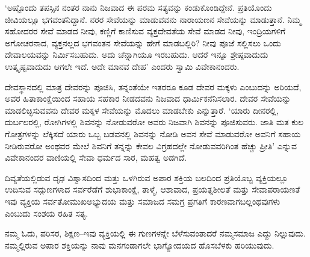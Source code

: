 ‘ಅಷ್ಟೊಂದು ತಪಸ್ಸಿನ ನಂತರ ನಾನು ನಿಜವಾದ ಈ ಪರಮ ಸತ್ಯವನ್ನು ಕಂಡುಕೊಂಡಿದ್ದೇನೆ. ಪ್ರತಿಯೊಂದು ಜೀವಿಯಲ್ಲೂ ಭಗವಂತನಿದ್ದಾನೆ. ನರರ ಸೇವೆಯನ್ನು ಮಾಡುವವನು ನಾರಾಯಣನ ಸೇವೆಯನ್ನು ಮಾಡುತ್ತಾನೆ. ನಿಮ್ಮ ಸಹೋದರರ ಸೇವೆ ಮಾಡದ ನೀವು, ಕಣ್ಣಿಗೆ ಕಾಣಿಸುವ ವ್ಯಕ್ತದೇವತೆಯ ಸೇವೆ ಮಾಡದ ನೀವು, ಇಂದ್ರಿಯಗಳಿಗೆ ಅಗೋಚರನಾದ, ವ್ಯಕ್ತನಲ್ಲದ ಭಗವಂತನ ಸೇವೆಯನ್ನು ಹೇಗೆ ಮಾಡಬಲ್ಲಿರಿ? ನೀವು ಪೂಜೆ ಸಲ್ಲಿಸಲು ಒಂದು ದೇವಾಲಯವನ್ನು ನಿರ್ಮಿಸಬಹುದು. ಅದು ಚೆನ್ನಾಗಿಯೂ ಇರಬಹುದು. ಆದರೆ ಇನ್ನೂ ಶ್ರೇಷ್ಠವಾದುದು ಉತ್ಕೃಷ್ಟವಾದುದು ಆಗಲೇ ಇದೆ. ಅದೇ ಮಾನವ ದೇಹ’ ಎಂದರು ಸ್ವಾಮಿ ವಿವೇಕಾನಂದರು.

ದೇವಸ್ಥಾನದಲ್ಲಿ ಮಾತ್ರ ದೇವರನ್ನು ಪೂಜಿಸಿ, ತನ್ನಂತೆಯೇ ಇತರರೂ ಕೂಡ ದೇವರ ಮಕ್ಕಳು ಎಂಬುದನ್ನು ಅರಿಯದೆ, ಅವರ ಹಿತಾಕಾಂಕ್ಷೆಯಿಂದ ಸಹಾಯ ಸಹಕಾರ ನೀಡದವನು ನಿಜವಾದ ಧಾರ್ಮಿಕನೆನಿಸಲಾರ. ದೇವರ ಸೇವೆಯನ್ನು ಮಾಡಲಿಚ್ಛಿಸುವವನು ದೇವರ ಮಕ್ಕಳ ಸೇವೆಯನ್ನು ಮೊದಲು ಮಾಡಬೇಕು ಎನ್ನುತ್ತಾರೆ. ‘ಯಾರು ದೀನರಲ್ಲಿ, ದುರ್ಬಲರಲ್ಲಿ, ರೋಗಿಗಳಲ್ಲಿ ಶಿವನನ್ನು ನೋಡುವರೋ ಅವರು ನಿಜವಾಗಿ ಶಿವನನ್ನು ಪೂಜಿಸುವರು. ಜಾತಿ ಮತ ಕುಲ ಗೋತ್ರಗಳನ್ನು ಲೆಕ್ಕಿಸದೆ ಯಾರು ಒಬ್ಬ ಬಡವನಲ್ಲಿ ಶಿವನನ್ನು ನೋಡಿ ಅವನ ಸೇವೆ ಮಾಡುವರೋ ಅವನಿಗೆ ಸಹಾಯ ನೀಡಿರುವರೋ ಅಂಥವರ ಮೇಲೆ ಶಿವನಿಗೆ ತನ್ನನ್ನು ಕೇವಲ ವಿಗ್ರಹದಲ್ಲೇ ನೋಡುವವರಿಗಿಂತ ಹೆಚ್ಚು ಪ್ರೀತಿ’ ಎನ್ನುವ ವಿವೇಕಾನಂದರ ವಾಣಿಯಲ್ಲಿ ಸೇವಾ ಧರ್ಮದ ಸಾರ, ಮಹತ್ವ ಅಡಗಿದೆ.

ದಿವ್ಯತೆಯಲ್ಲಿಡುವ ದೃಢ ವಿಶ್ವಾಸದಿಂದ ಮತ್ತು ಒಳಗಿರುವ ಅಪಾರ ಶಕ್ತಿಯ ಬಲದಿಂದ ಪ್ರತಿಯೊಬ್ಬ ವ್ಯಕ್ತಿಯಲ್ಲೂ ಉದಿಸುವ ಸದ್ಗುಣಗಳಾದ ಸರ್ವರೆಡೆಗೆ ಶುಭಾಕಾಂಕ್ಷೆ, ತಾಳ್ಮೆ, ಆಶಾವಾದ, ಪ್ರಯತ್ನಶೀಲತೆ ಮತ್ತು ಸೇವಾಪರಾಯಣತೆ ಇವು ವ್ಯಕ್ತಿಯ ಸರ್ವತೋಮುಖ\break ಅಭ್ಯುದಯ ಮತ್ತು ಸಮಾಜದ ಸಮಗ್ರ ಪ್ರಗತಿಗೆ ಕಾರಣವಾಗಬಲ್ಲಂಥವುಗಳು ಎಂಬುದು ಸಂಶಯ ರಹಿತ ಸತ್ಯ.

ನಮ್ಮ ಓದು, ಪರಿಸರ, ಶಿಕ್ಷಣ–ಇವು ವ್ಯಕ್ತಿಯಲ್ಲಿ ಈ ಗುಣಗಳನ್ನೇ ಬೆಳೆಸುವಂತಾದರೆ ನಮ್ಮಸಮಾಜ ಎದ್ದು ನಿಲ್ಲುವುದು. ನಮ್ಮಲ್ಲಿರುವ ಅಪಾರ ಶಕ್ತಿಯನ್ನು ನಾವು ಮನಗಂಡಾಗಲೇ ಭಾಗ್ಯೋದಯದ ಹೊಸಬೆಳಕು ಹರಿಯುವುದು.


\chapterend

